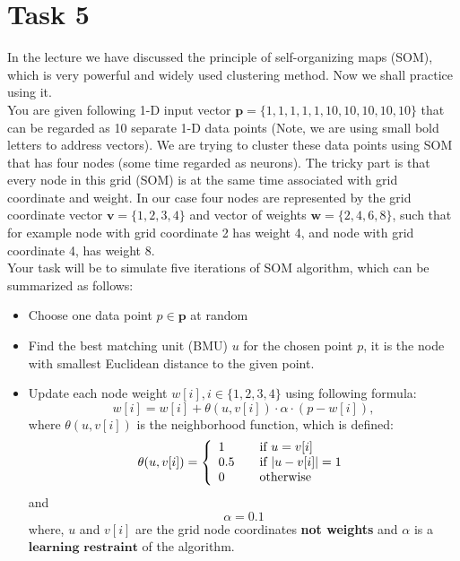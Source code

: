 \documentclass{article}
\begin{document}
\section*{Task 5}
In the lecture we have discussed the principle of self-organizing maps (SOM), which is very powerful and widely used clustering method. Now we shall practice using it.\\ You are given following 1-D input vector $\textbf{p} = \{1,1,1,1,1,10,10,10,10,10\}$ that can be regarded as 10 separate 1-D data points (Note, we are using small bold letters to address vectors). We are trying to cluster these data points using SOM that has four nodes (some time regarded as neurons). The tricky part is that every node in this grid (SOM) is at the same time associated with grid coordinate and weight. In our case four nodes are represented by the grid coordinate vector $\textbf{v} = \{1,2,3,4\}$ and vector of weights  $\textbf{w} = \{2,4,6,8\}$, such that for example node with grid coordinate 2 has weight 4, and node with grid coordinate 4, has weight 8.\\
Your task will be to simulate five iterations of SOM algorithm, which can be summarized as follows: 
\begin{itemize}
\item Choose one data point $p \in\textbf{p}$ at random
\item Find the best matching unit (BMU) $u$  for the chosen point $p$, it is the node with smallest Euclidean distance to the given point.
\item Update  each node weight $w[i], i \in \{1,2,3,4\}$ using following formula:
$$
w[i] = w[i] + \theta(u, v[i])\cdot\alpha\cdot(p - w[i]),
$$
where  $\theta(u,v[i])$ is the neighborhood function, which is defined:
\[ \theta(u, v[i]) = \left\{ 
  \begin{array}{l l}
    1 & \quad \text{if $u = v[i]$}\\
    0.5 & \quad \text{if $|u - v[i]| = 1$}\\
    0 & \quad \text{otherwise}
 \end{array} \right.\]
and
$$
\alpha = 0.1
$$
where, $u$ and $v[i]$ are the grid node coordinates \textbf{not  weights} and $\alpha$ is a $\textbf{learning restraint}$ of the algorithm.

\end{itemize}
\end{document}
